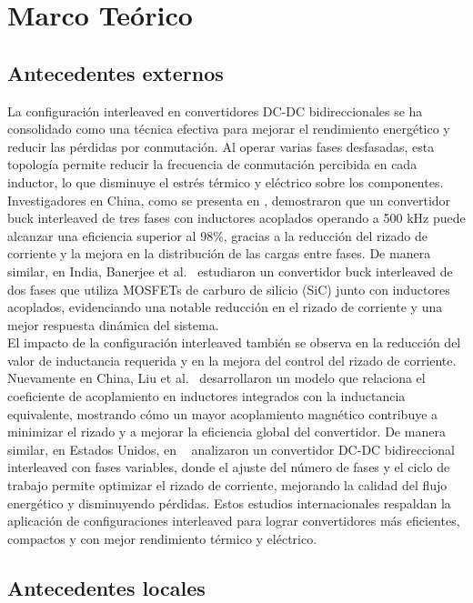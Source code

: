 \section{Marco Teórico}

\subsection{Antecedentes externos}

La configuración interleaved en convertidores DC-DC bidireccionales se ha consolidado como una técnica efectiva para mejorar el rendimiento energético y reducir las pérdidas por conmutación. Al operar varias fases desfasadas, esta topología permite reducir la frecuencia de conmutación percibida en cada inductor, lo que disminuye el estrés térmico y eléctrico sobre los componentes. Investigadores en China, como se presenta en \cite{liu2023interleaved}, demostraron que un convertidor buck interleaved de tres fases con inductores acoplados operando a 500 kHz puede alcanzar una eficiencia superior al 98\%, gracias a la reducción del rizado de corriente y la mejora en la distribución de las cargas entre fases. De manera similar, en India, Banerjee et al.~\cite{banerjee2024sic} estudiaron un convertidor buck interleaved de dos fases que utiliza MOSFETs de carburo de silicio (SiC) junto con inductores acoplados, evidenciando una notable reducción en el rizado de corriente y una mejor respuesta dinámica del sistema.\\
El impacto de la configuración interleaved también se observa en la reducción del valor de inductancia requerida y en la mejora del control del rizado de corriente. Nuevamente en China, Liu et al.~\cite{liu2023interleaved} desarrollaron un modelo que relaciona el coeficiente de acoplamiento en inductores integrados con la inductancia equivalente, mostrando cómo un mayor acoplamiento magnético contribuye a minimizar el rizado y a mejorar la eficiencia global del convertidor. De manera similar, en Estados Unidos, en ~\cite{duan2023multiphase} analizaron un convertidor DC-DC bidireccional interleaved con fases variables, donde el ajuste del número de fases y el ciclo de trabajo permite optimizar el rizado de corriente, mejorando la calidad del flujo energético y disminuyendo pérdidas. Estos estudios internacionales respaldan la aplicación de configuraciones interleaved para lograr convertidores más eficientes, compactos y con mejor rendimiento térmico y eléctrico.


\subsection{Antecedentes locales}

